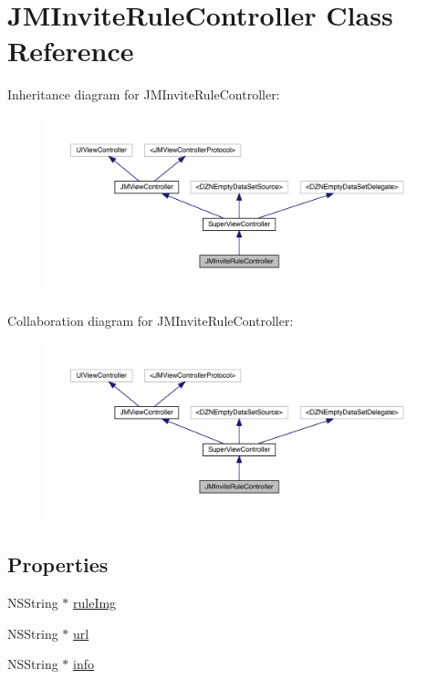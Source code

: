 \hypertarget{interface_j_m_invite_rule_controller}{}\section{J\+M\+Invite\+Rule\+Controller Class Reference}
\label{interface_j_m_invite_rule_controller}


Inheritance diagram for J\+M\+Invite\+Rule\+Controller\+:\nopagebreak
\begin{figure}[H]
\begin{center}
\leavevmode
\includegraphics[width=350pt]{interface_j_m_invite_rule_controller__inherit__graph}
\end{center}
\end{figure}


Collaboration diagram for J\+M\+Invite\+Rule\+Controller\+:\nopagebreak
\begin{figure}[H]
\begin{center}
\leavevmode
\includegraphics[width=350pt]{interface_j_m_invite_rule_controller__coll__graph}
\end{center}
\end{figure}
\subsection*{Properties}
\begin{DoxyCompactItemize}
\item 
N\+S\+String $\ast$ \mbox{\hyperlink{interface_j_m_invite_rule_controller_a9adec26c5c418889567af0c37addc705}{rule\+Img}}
\item 
N\+S\+String $\ast$ \mbox{\hyperlink{interface_j_m_invite_rule_controller_a557c07a3a07a76b8e8668f71ef9f7ed6}{url}}
\item 
N\+S\+String $\ast$ \mbox{\hyperlink{interface_j_m_invite_rule_controller_a6772b6a2d98019293bc963ac957b10d6}{info}}
\end{DoxyCompactItemize}
